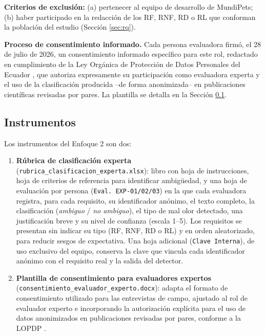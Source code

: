 \documentclass[journal,onecolumn]{IEEEtran}
\begin{document}
	\textbf{Criterios de exclusión:} (a) pertenecer al equipo de desarrollo de
	MundiPets; (b) haber participado en la redacción de los RF, RNF, RD o RL que
	conforman la población del estudio (Sección \ref{sec:rq}).
	
	\textbf{Proceso de consentimiento informado.} Cada persona evaluadora firmó,
	el 28 de julio de 2026, un consentimiento informado específico para este rol,
	redactado en cumplimiento de la Ley Orgánica de Protección de Datos
	Personales del Ecuador \cite{lopdp2021}, que autoriza expresamente su
	participación como evaluadora experta y el uso de la clasificación
	producida --de forma anonimizada-- en publicaciones científicas revisadas
	por pares. La plantilla se detalla en la Sección \ref{sec:instrumentos}.
	
	\subsection{Instrumentos}
	\label{sec:instrumentos}
	
	Los instrumentos del Enfoque 2 son dos:
	
	\begin{enumerate}[leftmargin=*]
		\item \textbf{Rúbrica de clasificación experta}
		(\texttt{rubrica\_clasificacion\_experta.xlsx}): libro con hoja de
		instrucciones, hoja de criterios de referencia para identificar
		ambigüedad, y una hoja de evaluación por persona (\texttt{Eval.
		EXP-01/02/03}) en la que cada evaluadora registra, para cada requisito,
		su identificador anónimo, el texto completo, la clasificación
		(\emph{ambiguo} / \emph{no ambiguo}), el tipo de mal olor detectado, una
		justificación breve y su nivel de confianza (escala 1--5). Los
		requisitos se presentan sin indicar su tipo (RF, RNF, RD o RL) y en
		orden aleatorizado, para reducir sesgos de expectativa. Una hoja
		adicional (\texttt{Clave Interna}), de uso exclusivo del equipo,
		conserva la clave que vincula cada identificador anónimo con el
		requisito real y la salida del detector.
		\item \textbf{Plantilla de consentimiento para evaluadores expertos}
		(\texttt{consentimiento\_evaluador\_experto.docx}): adapta el formato
		de consentimiento utilizado para las entrevistas de campo, ajustado al
		rol de evaluador experto e incorporando la autorización explícita
		para el uso de datos anonimizados en publicaciones revisadas por
		pares, conforme a la LOPDP \cite{lopdp2021}.
	\end{enumerate}
	
\end{document}
